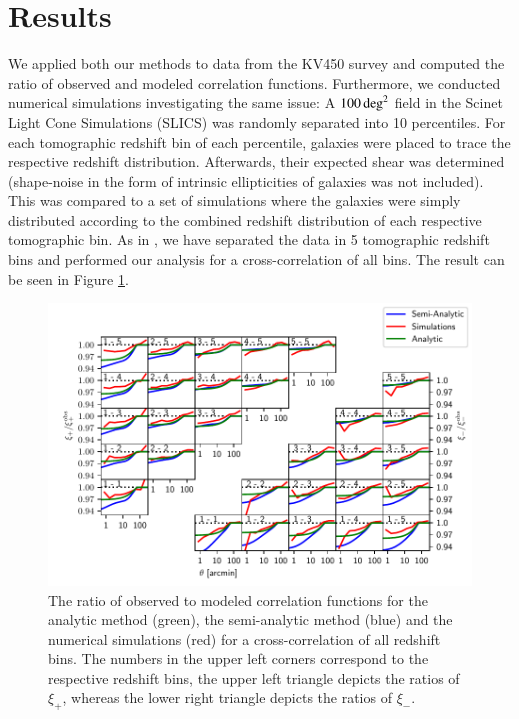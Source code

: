 \section{Results}
\label{sec:results}
We applied both our methods to data from the KV450 survey and computed the ratio of observed and modeled correlation functions. Furthermore, we conducted numerical simulations investigating the same issue: A $100\,\rm{deg}^2$ field in the Scinet Light Cone Simulations (SLICS) \citep{2018MNRAS.481.1337H} was randomly separated into 10 percentiles. For each tomographic redshift bin of each percentile, galaxies were placed to trace the respective redshift distribution. Afterwards, their expected shear was determined (shape-noise in the form of intrinsic ellipticities of galaxies was not included). This was compared to a set of simulations where the galaxies were simply distributed according to the combined redshift distribution of each respective tomographic bin. As in \citet{2018arXiv181206076H}, we have separated the data in 5 tomographic redshift bins and performed our analysis for a cross-correlation of all bins. The result can be seen in Figure \ref{fig:all_xis}.
	\begin{figure}
	\centering
	\includegraphics[width=1\textwidth]{images/allxis_0111.pdf}
	\caption{The ratio of observed to modeled correlation functions for the analytic method (green), the semi-analytic method (blue) and the numerical simulations (red) for a cross-correlation of all redshift bins. The numbers in the upper left corners correspond to the respective redshift bins, the upper left triangle depicts the ratios of $\xi_+$, whereas the lower right triangle depicts the ratios of $\xi_-$.}
	\label{fig:all_xis}
	\end{figure}

